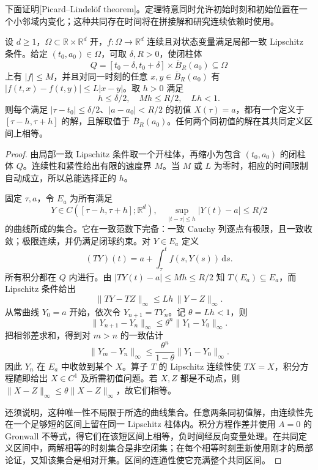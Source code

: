 \ProseParagraphBreak
下面证明[Picard--Lindelöf theorem]。定理特意同时允许初始时刻和初始位置在一个小邻域内变化；这种共同存在时间将在拼接解和研究连续依赖时使用。

\begin{theorem}\label{b2:thm:ode-nonautonomous-picard}
设 \(d\geq1\)，\(\Omega\subset\mathbb R\times\mathbb R^d\) 开，\(f\colon\Omega\to\mathbb R^d\) 连续且对状态变量满足局部一致 Lipschitz 条件。给定 \((t_0,a_0)\in\Omega\)，可取 \(\delta,R>0\)，使闭柱体
\[
 Q=[t_0-\delta,t_0+\delta]\times\overline B_R(a_0)
 \subseteq\Omega
\]
上有 \(|f|\leq M\)，并且对同一时刻的任意 \(x,y\in\overline B_R(a_0)\) 有 \(|f(t,x)-f(t,y)|\leq L|x-y|\)。取 \(h>0\) 满足
\[
 h\leq\delta/2,\quad Mh\leq R/2,\quad Lh<1.
\]
则每个满足 \(|\tau-t_0|\leq\delta/2\)、\(|a-a_0|<R/2\) 的初值 \(X(\tau)=a\)，都有一个定义于 \([\tau-h,\tau+h]\) 的解，且解取值于 \(\overline B_R(a_0)\)。任何两个同初值的解在其共同定义区间上相等。
\end{theorem}
\begin{proof}
由局部一致 Lipschitz 条件取一个开柱体，再缩小为包含 \((t_0,a_0)\) 的闭柱体 \(Q\)。连续性和紧性给出有限的速度界 \(M\)。当 \(M\) 或 \(L\) 为零时，相应的时间限制自动成立，所以总能选择正的 \(h\)。

固定 \(\tau,a\)，令 \(E_a\) 为所有满足
\[
 Y\in C([\tau-h,\tau+h];\mathbb R^d),
 \quad \sup_{|t-\tau|\leq h}|Y(t)-a|\leq R/2
\]
的曲线所成的集合。它在一致范数下完备：一致 Cauchy 列逐点有极限，且一致收敛；极限连续，并仍满足闭球约束。对 \(Y\in E_a\) 定义
\[
 (TY)(t)=a+\int_\tau^t f(s,Y(s))\,\mathrm ds.
\]
所有积分都在 \(Q\) 内进行。由 \(|TY(t)-a|\leq Mh\leq R/2\) 知 \(T(E_a)\subseteq E_a\)，而 Lipschitz 条件给出
\[
 \|TY-TZ\|_\infty\leq Lh\,\|Y-Z\|_\infty.
\]
从常曲线 \(Y_0=a\) 开始，依次令 \(Y_{n+1}=TY_n\)。记 \(\theta=Lh<1\)，则
\[
 \|Y_{n+1}-Y_n\|_\infty
 \leq\theta^n\|Y_1-Y_0\|_\infty.
\]
把相邻差求和，得到对 \(m>n\) 的一致估计
\[
 \|Y_m-Y_n\|_\infty
 \leq\frac{\theta^n}{1-\theta}\|Y_1-Y_0\|_\infty.
\]
因此 \(Y_n\) 在 \(E_a\) 中收敛到某个 \(X\)。算子 \(T\) 的 Lipschitz 连续性使 \(TX=X\)，积分方程随即给出 \(X\in C^1\) 及所需初值问题。若 \(X,Z\) 都是不动点，则 \(\|X-Z\|_\infty\leq\theta\|X-Z\|_\infty\)，故它们相等。

还须说明，这种唯一性不局限于所选的曲线集合。任意两条同初值解，由连续性先在一个足够短的区间上留在同一 Lipschitz 柱体内。积分方程作差并使用 \(A=0\) 的 Gronwall 不等式，得它们在该短区间上相等，负时间经反向变量处理。在共同定义区间中，两解相等的时刻集合是非空闭集；在每个相等时刻重新使用刚才的局部论证，又知该集合是相对开集。区间的连通性使它充满整个共同区间。
\end{proof}

